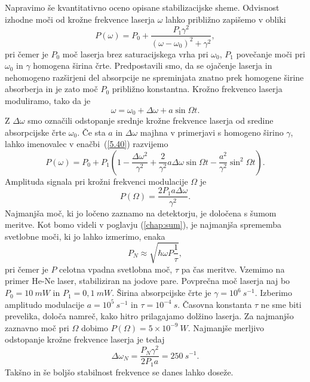Napravimo še kvantitativno oceno opisane stabilizacijske sheme. Odvisnost
izhodne moči od krožne frekvence laserja $\omega$ lahko približno zapišemo v
obliki 
\begin{equation}  
\label{5.40}
P(\omega)=P_0 + \frac{P_1\gamma^2}{(\omega- \omega_0)^2+\gamma^2},
\end{equation}
pri čemer je $P_0$ moč laserja brez saturacijskega vrha pri $\omega_0$, $P_1$ 
povečanje moči pri $\omega_0$ in $\gamma$ homogena širina črte. Predpostavili 
smo, da se ojačenje laserja in nehomogeno razširjeni del absorpcije ne 
spreminjata znatno prek homogene širine absorberja in je zato moč $P_0$ 
približno konstantna. Krožno frekvenco laserja moduliramo, tako da je 
\begin{equation}  
\label{5.41}
\omega=\omega_0+\Delta\omega+a \sin \Omega t.
\end{equation}
Z $\Delta\omega$ smo označili odstopanje srednje krožne frekvence laserja od
sredine absorpcijske črte $\omega_0$. Če sta $a$ in $\Delta\omega$ majhna v
primerjavi s homogeno širino $\gamma$, lahko imenovalec v enačbi~(\ref{5.40})
razvijemo
\begin{equation}  
\label{5.42}
P(\omega)=P_0+P_1 \left(1-\frac{\Delta\omega^2}{\gamma^2} +\frac{2}{\gamma^2} a
\Delta\omega \sin\Omega t - \frac{a^2}{\gamma^2}\sin^2\Omega t\right).
\end{equation}
Amplituda signala pri krožni frekvenci modulacije $\Omega$ je 
\begin{equation}
P(\Omega) = \frac{2P_1 a \Delta\omega}{\gamma^2}. 
\end{equation}
Najmanjša moč, ki jo ločeno zaznamo na detektorju, je določena s šumom 
meritve. Kot bomo videli v poglavju (\ref{chap:sum}), je najmanjša 
sprememba svetlobne moči, ki jo lahko izmerimo, enaka 
\begin{equation}  
\label{5.43}
P_N\approx \sqrt{\hbar\omega P \frac{1}{\tau}},
\end{equation}
pri čemer je $P$ celotna vpadna svetlobna moč, $\tau$ pa čas
meritve. Vzemimo na primer He-Ne laser, stabiliziran na 
jodove pare. Povprečna moč laserja naj bo $P_0 = 10~\si{mW}$ in $P_1= 0,1~\si{mW}$. 
Širina absorpcijske črte je $\gamma= 10^6~\si{s}^{-1}$. Izberimo amplitudo 
modulacije $a=10^5~\si{s}^{-1}$ in $\tau=10^{-4}~\si{s}$. Časovna konstanta 
$\tau$ ne sme biti prevelika, določa namreč, kako hitro prilagajamo dolžino 
laserja. Za najmanjšo zaznavno moč pri $\Omega$ dobimo 
$P(\Omega) = 5\times10^{-9}~\si{W}$.
Najmanjše merljivo odstopanje krožne frekvence laserja je tedaj 
\begin{equation}  
\label{5.44}
\Delta\omega_N=\frac{P_N \gamma^2}{2P_1 a}=250~\si{s}^{-1}.
\end{equation}
Takšno in še boljšo stabilnost frekvence se danes lahko doseže. 

